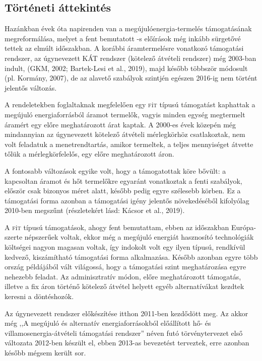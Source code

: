 \documentclass[twoside, magyar, showtrims]{corvinusphd}
\theoremstyle{plain}
\theoremstyle{remark}
\theoremstyle{definition}
\newcommand{\fit}{\textsc{f}i\textsc{t}\index{\textsc{f}i\textsc{t}} }
\begin{document}
\subsection{Történeti áttekintés}

Hazánkban évek óta napirenden van a megújulóenergia-termelés 
támogatásának megreformálása, melyet a fent bemutatott -s előírások
még inkább sürgetővé tettek az elmúlt időszakban.
A korábbi áramtermelésre vonatkozó támogatási rendszer,
az úgynevezett KÁT rendszer (kötelező átvételi rendszer)
még 2003-ban indult, (GKM, 2002; Bartek-Lesi et al., 2019), 
majd később többször módosult (pl. Kormány, 2007), de az
alavető szabályok szintjén egészen 2016-ig nem történt jelentős változás.

A rendeletekben foglaltaknak megfelelően egy \fit típusú támogatást
kaphattak a megújuló energiaforrásból áramot termelők, vagyis minden egység megtermelt
áramért egy előre meghatározott árat kaptak.
A 2000-es évek közepén még mindannyian az úgynevezett
kötelező átvételi mérlegkörhöz csatlakoztak,
nem volt feladatuk a menetrendtartás, amikor termeltek,
a teljes mennyiséget átvette tőlük a mérlegkörfelelős,
egy előre meghatározott áron. 

A fontosabb változások egyike volt, hogy a támogatottak köre bővült:
a kapcsoltan áramot és hőt termelőkre egyaránt vonatkoztak
a fenti szabályok, először csak bizonyos méret alatt,
később pedig egyre szélesebb körben.
Ez a támogatási forma azonban a támogatási igény
jelentős növekedéséből kifolyólag 2010-ben megszűnt
(részletekért lásd: Kácsor et al., 2019).

A \fit típusú támogatások, ahogy fent bemutattam,
ebben az időszakban Európa-szerte
népszerűek voltak, ekkor még a megújuló
energiát hasznosító technológiák költségei
nagyon magasan voltak, így indokolt volt
egy ilyen típusú, rendkívül kedvező, kiszámítható
támogatási forma alkalmazása. Később azonban egyre több
ország példájából vált világossá, hogy 
a támogatási szint meghatározása egyre nehezebb feladat.
Az adminisztratív módon, előre meghatározott
támogatás, illetve a fix áron történő
kötelező átvétel helyett egyéb alternatívákat
kezdtek keresni a döntéshozók.

Az úgynevezett  rendszer előkészítése
itthon 2011-ben kezdődött meg.
Az akkor még ,,A megújuló és alternatív
energiaforrásokból előállított hő- és villamosenergia-átvételi
támogatási rendszer'' néven futó törvénytervezet első változata
2012-ben készült el, ebben 2013-as bevezetést
terveztek, erre azonban később mégsem került sor.
\end{document}
